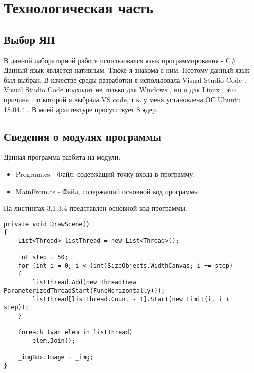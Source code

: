 \chapter{Технологическая часть}

\section{Выбор ЯП}

В данной лабораторной работе использовался язык программирования - C\# \cite{Microsoft}.
Данный язык является нативным.
Также я знакома с ним.
Поэтому данный язык был выбран.
В качестве среды разработки я использовала Visual Studio Code \cite{Vs}.
Visual Studio Code подходит не только для  Windows \cite{Win},
но и для Linux \cite{Lin}, это причина,
по которой я выбрала VS code,
т.к. у меня установлена ОС Ubuntu 18.04.4 \cite{Ubuntu}.
В моей архитектуре присутствует 8 ядер.


\section{Сведения о модулях программы}

Данная программа разбита на модули:

\begin{itemize}
	\item Program.cs - Файл, содержащий точку входа в программу.
	\item MainFrom.cs - Файл, содержащий основной код программы.
\end{itemize}

На листингах 3.1-3.4 представлен основной код программы.

\begin{lstlisting}[label=some-code,caption=Метод создания и запуска потоков]
private void DrawScene()
{
	List<Thread> listThread = new List<Thread>();

	int step = 50;
	for (int i = 0; i < (int)SizeObjects.WidthCanvas; i += step)
	{
		listThread.Add(new Thread(new ParameterizedThreadStart(FuncHorizontally)));
		listThread[listThread.Count - 1].Start(new Limit(i, i + step));
	}

	foreach (var elem in listThread)
		elem.Join();

	_imgBox.Image = _img;
}
\end{lstlisting}

